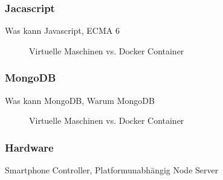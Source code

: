 \documentclass[a4paper]{spie}  %
\begin{document}
\subsubsection{Jacascript}
Was kann Javascript, ECMA 6
\begin{figure}[h!]
	\centering
		\caption{Virtuelle Maschinen vs. Docker Container\cite{dockercontainer}}
		\label{fig:dockerVM}
\end{figure}
\subsubsection{MongoDB}
Was kann MongoDB, Warum MongoDB
\begin{figure}[h!]
	\centering
		\caption{Virtuelle Maschinen vs. Docker Container\cite{dockercontainer}}
		\label{fig:dockerVM}
\end{figure}
\subsubsection{Hardware}
Smartphone Controller, Platformunabhängig Node Server

%
%
\end{document}
